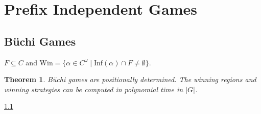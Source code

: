 \documentclass{article}
\newtheorem{theorem}{Theorem}
\begin{document}
\section{Prefix Independent Games}
\subsection{Büchi Games}
$F \subseteq C$ and $\text{Win} = \{ \alpha \in C^\omega \mid \text{Inf}(\alpha) \cap F \neq \emptyset \}$.

\begin{theorem}
	Büchi games are positionally determined. The winning regions and winning strategies can be computed in polynomial time in $|G|$.
\end{theorem}
\ref{} %
\end{document}
